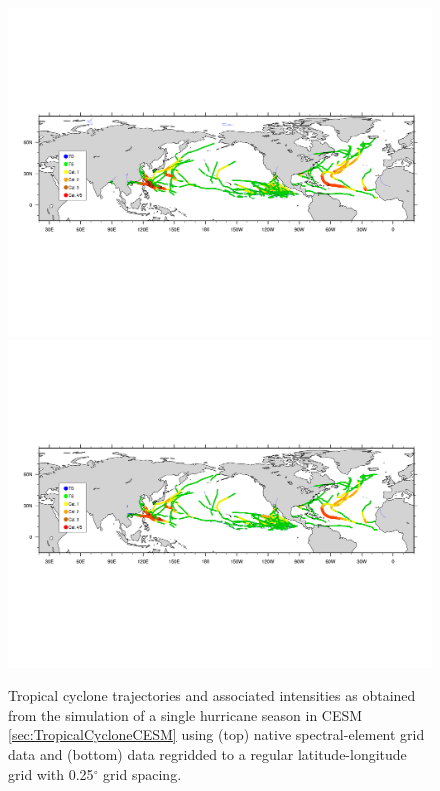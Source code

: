 \documentclass[gmdd, hvmath, online]{copernicus_discussions}
\begin{document}
\begin{figure}[H]
\begin{center}
\includegraphics[clip, trim=0.2cm 6.6cm 0.2cm 7.1cm, width=5in]{nhemi-traj_plotted.pdf}
\includegraphics[clip, trim=0.2cm 6.8cm 0.2cm 7.1cm, width=5in]{nhemi_regrid-traj_plotted.pdf}
\end{center}
\caption{Tropical cyclone trajectories and associated intensities as obtained from the simulation of a single hurricane season in CESM \ref{sec:TropicalCycloneCESM} using (top) native spectral-element grid data and (bottom) data regridded to a regular latitude-longitude grid with 0.25$^\circ$ grid spacing.} \label{fig:TropicalCycloneCESM}
\end{figure}




\end{document}
